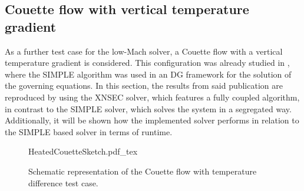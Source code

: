 \subsection{Couette flow with vertical temperature gradient} \label{ssec:CouetteFlowTempDiff}
As a further test case for the low-Mach solver, a Couette flow with a vertical temperature gradient is considered. This configuration was already studied in \textcite{kleinHighorderDiscontinuousGalerkin2016}, where the SIMPLE algorithm was used in an DG framework for the solution of the governing equations. In this section, the results from said publication are reproduced by using the XNSEC solver, which features a fully coupled algorithm, in contrast to the SIMPLE solver, which solves the system in a segregated way. Additionally, it will be shown how the implemented solver performs in relation to the SIMPLE based solver in terms of runtime.%
\begin{figure}[tb]
	\begin{center}
		\def\svgwidth{0.5\textwidth}
		{HeatedCouetteSketch.pdf_tex}
		\vspace{0.2cm}
		\caption{Schematic representation of the Couette flow with temperature difference test case.}\label{fig:CouetteTempDiff_scheme}
	\end{center}
\end{figure}%
